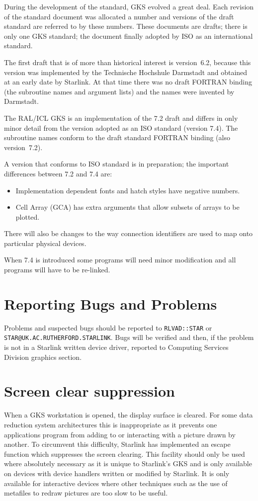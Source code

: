 During the development of the standard, GKS evolved a great deal.
Each revision of the standard document was allocated a number and versions of
the draft standard are referred to by these numbers.
These documents are drafts; there is only one GKS standard; the document finally
adopted by ISO as an international standard.

The first draft that is of more than historical interest is version~6.2, because
this version was implemented by the Technische Hochshule Darmstadt and obtained
at an early date by Starlink.
At that time there was no draft FORTRAN binding (the subroutine names and
argument lists) and the names were invented by Darmstadt.

The RAL/ICL GKS is an implementation of the 7.2 draft and differs in only minor
detail from the version adopted as an ISO standard (version 7.4).
The subroutine names conform to the draft standard FORTRAN binding (also
version~7.2).

A version that conforms to ISO standard is in preparation; the important
differences between 7.2 and 7.4 are:
\begin{itemize}
\item Implementation dependent fonts and hatch styles have negative numbers.
\item Cell Array (GCA) has extra arguments that allow subsets of arrays
to be plotted.
\end{itemize}
There will also be changes to the way connection identifiers are used to map
onto particular physical devices.

When 7.4 is introduced some programs will need minor modification and all
programs will have to be re-linked.

\section{Reporting Bugs and Problems}
Problems and suspected bugs should be reported to {\tt RLVAD::STAR} or
{\tt STAR@UK.\linebreak[0]AC.\linebreak[0]RUTHERFORD.\linebreak[0]STARLINK}.
Bugs will be verified and then, if the problem is not in a Starlink written
device driver, reported to Computing Services Division graphics section.

\section{Screen clear suppression}
When a GKS workstation is opened, the display surface is cleared.
For some data reduction system architectures this is inappropriate as it
prevents one applications program from adding to or interacting with a picture
drawn by another.
To circumvent this difficulty, Starlink has implemented an escape function which
suppresses the screen clearing.
This facility should only be used where absolutely necessary as it is unique to
Starlink's GKS and is only available on devices with device handlers written
or modified by Starlink.
It is only available for interactive devices where other techniques such as the
use of metafiles to redraw pictures are too slow to be useful.

